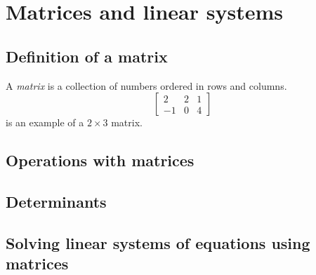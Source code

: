 \chapter{Matrices and linear systems}
\thispagestyle{noheaders}

\section{Definition of a matrix}
\begin{defi}[Matrix]
    A \textit{matrix} is a collection of numbers ordered in rows and columns.
    \begin{equation}
        \begin{bmatrix} 2 & 2 & 1 \\ -1 & 0 & 4 \end{bmatrix}
    \end{equation}
    is an example of a $2\times 3$ matrix.
\end{defi}

\section{Operations with matrices}

\section{Determinants}

\section{Solving linear systems of equations using matrices}
